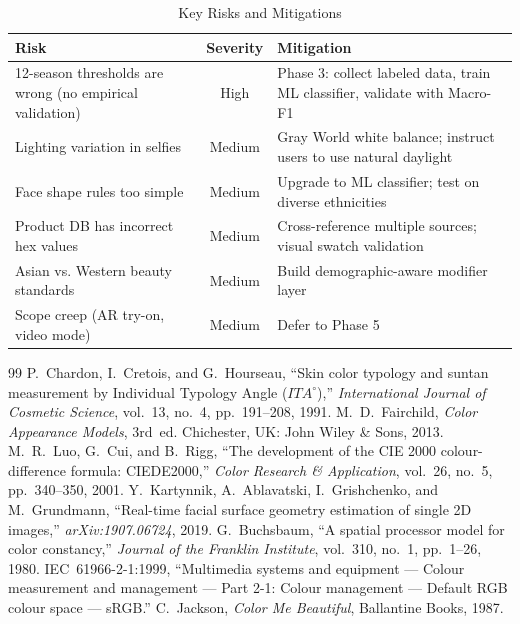 \documentclass[12pt,a4paper]{article}
\begin{document}
\begin{table}[H]
\centering
\caption{Key Risks and Mitigations}
\begin{tabular}{@{}p{5cm} c p{6cm}@{}}
\toprule
\textbf{Risk} & \textbf{Severity} & \textbf{Mitigation} \\
\midrule
12-season thresholds are wrong (no empirical validation) & High & Phase 3: collect labeled data, train ML classifier, validate with Macro-F1 \\
Lighting variation in selfies & Medium & Gray World white balance; instruct users to use natural daylight \\
Face shape rules too simple & Medium & Upgrade to ML classifier; test on diverse ethnicities \\
Product DB has incorrect hex values & Medium & Cross-reference multiple sources; visual swatch validation \\
Asian vs. Western beauty standards & Medium & Build demographic-aware modifier layer \\
Scope creep (AR try-on, video mode) & Medium & Defer to Phase 5 \\
\bottomrule
\end{tabular}
\end{table}


\begin{thebibliography}{99}
 P.~Chardon, I.~Cretois, and G.~Hourseau, ``Skin color typology and suntan measurement by Individual Typology Angle ($ITA^{\circ}$),'' \textit{International Journal of Cosmetic Science}, vol.~13, no.~4, pp.~191--208, 1991.
 M.~D.~Fairchild, \textit{Color Appearance Models}, 3rd~ed. Chichester, UK: John Wiley \& Sons, 2013.
 M.~R.~Luo, G.~Cui, and B.~Rigg, ``The development of the CIE 2000 colour-difference formula: CIEDE2000,'' \textit{Color Research \& Application}, vol.~26, no.~5, pp.~340--350, 2001.
 Y.~Kartynnik, A.~Ablavatski, I.~Grishchenko, and M.~Grundmann, ``Real-time facial surface geometry estimation of single 2D images,'' \textit{arXiv:1907.06724}, 2019.
 G.~Buchsbaum, ``A spatial processor model for color constancy,'' \textit{Journal of the Franklin Institute}, vol.~310, no.~1, pp.~1--26, 1980.
 IEC~61966-2-1:1999, ``Multimedia systems and equipment --- Colour measurement and management --- Part 2-1: Colour management --- Default RGB colour space --- sRGB.''
 C.~Jackson, \textit{Color Me Beautiful}, Ballantine Books, 1987.
\end{thebibliography}
\end{document}
